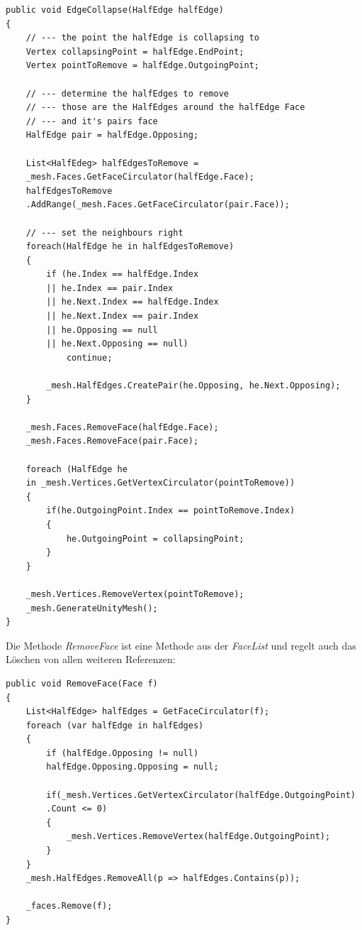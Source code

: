 \begin{lstlisting}
public void EdgeCollapse(HalfEdge halfEdge)
{
	// --- the point the halfEdge is collapsing to
	Vertex collapsingPoint = halfEdge.EndPoint;
	Vertex pointToRemove = halfEdge.OutgoingPoint;

	// --- determine the halfEdges to remove
	// --- those are the HalfEdges around the halfEdge Face 
	// --- and it's pairs face
	HalfEdge pair = halfEdge.Opposing;

	List<HalfEdeg> halfEdgesToRemove =
	_mesh.Faces.GetFaceCirculator(halfEdge.Face);
	halfEdgesToRemove
	.AddRange(_mesh.Faces.GetFaceCirculator(pair.Face));

	// --- set the neighbours right
	foreach(HalfEdge he in halfEdgesToRemove)
	{
		if (he.Index == halfEdge.Index 
		|| he.Index == pair.Index 
		|| he.Next.Index == halfEdge.Index 
		|| he.Next.Index == pair.Index
		|| he.Opposing == null 
		|| he.Next.Opposing == null)
			continue;

		_mesh.HalfEdges.CreatePair(he.Opposing, he.Next.Opposing);
	}

	_mesh.Faces.RemoveFace(halfEdge.Face);
	_mesh.Faces.RemoveFace(pair.Face);

	foreach (HalfEdge he 
	in _mesh.Vertices.GetVertexCirculator(pointToRemove))
	{
		if(he.OutgoingPoint.Index == pointToRemove.Index)
		{
			he.OutgoingPoint = collapsingPoint;
		}
	}

	_mesh.Vertices.RemoveVertex(pointToRemove);
	_mesh.GenerateUnityMesh();
}
\end{lstlisting}
Die Methode \textit{RemoveFace} ist eine Methode aus der \textit{FaceList} und regelt auch das L\"oschen von allen weiteren Referenzen:
\begin{lstlisting}
public void RemoveFace(Face f)
{
	List<HalfEdge> halfEdges = GetFaceCirculator(f);
	foreach (var halfEdge in halfEdges)
	{
		if (halfEdge.Opposing != null)
		halfEdge.Opposing.Opposing = null;

		if(_mesh.Vertices.GetVertexCirculator(halfEdge.OutgoingPoint)
		.Count <= 0)
		{
			_mesh.Vertices.RemoveVertex(halfEdge.OutgoingPoint);
		}
	}
	_mesh.HalfEdges.RemoveAll(p => halfEdges.Contains(p));

	_faces.Remove(f);
}
\end{lstlisting}


